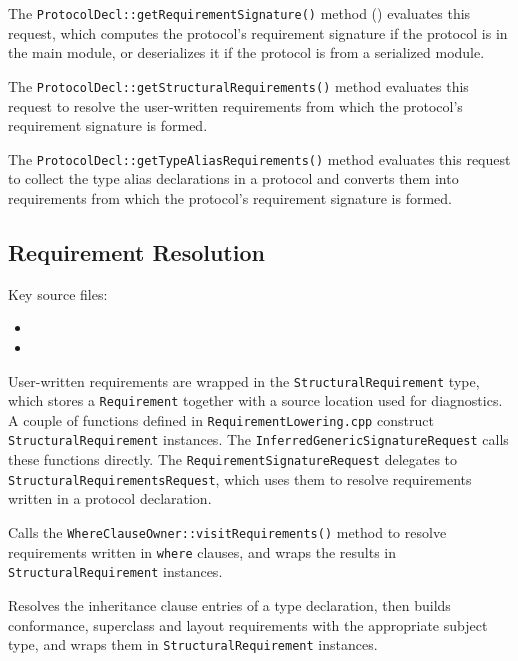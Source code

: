 \documentclass[../generics]{subfiles}
\begin{document}
The \texttt{ProtocolDecl::getRequirementSignature()} method () evaluates this request, which computes the protocol's requirement signature if the protocol is in the main module, or deserializes it if the protocol is from a serialized module.

The \texttt{ProtocolDecl::getStructuralRequirements()} method evaluates this request to resolve the user-written requirements from which the protocol's requirement signature is formed.

The \texttt{ProtocolDecl::getTypeAliasRequirements()} method evaluates this request to collect the type alias declarations in a protocol and converts them into requirements from which the protocol's requirement signature is formed.

\subsection*{Requirement Resolution}

Key source files:
\begin{itemize}
\item {}
\item {}
\end{itemize}

User-written requirements are wrapped in the \texttt{StructuralRequirement} type, which stores a \texttt{Requirement} together with a source location used for diagnostics. A couple of functions defined in \texttt{RequirementLowering.cpp} construct \texttt{StructuralRequirement} instances. The \texttt{InferredGenericSignatureRequest} calls these functions directly. The \texttt{RequirementSignatureRequest} delegates to \texttt{StructuralRequirementsRequest}, which uses them to resolve requirements written in a protocol declaration.

Calls the \texttt{WhereClauseOwner::visitRequirements()} method to resolve requirements written in \texttt{where} clauses, and wraps the results in \texttt{StructuralRequirement} instances.

Resolves the inheritance clause entries of a type declaration, then builds conformance, superclass and layout requirements with the appropriate subject type, and wraps them in \texttt{StructuralRequirement} instances.
\end{document}
